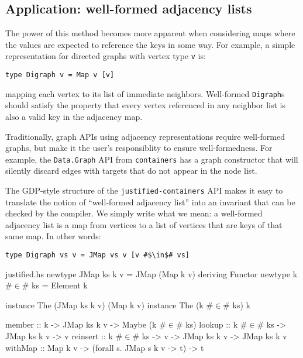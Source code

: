 \documentclass[format=sigplan, review=false, screen=true]{acmart}
\begin{document}
\subsection{Application: well-formed adjacency lists}

The power of this method becomes more apparent when considering maps where
the values are expected to reference the keys in some way. For example, a
simple representation for directed graphs with vertex type \texttt{v} is:
\begin{verbatim}
type Digraph v = Map v [v]
\end{verbatim}
mapping each vertex to its list of immediate neighbors. Well-formed \texttt{Digraph}s
should satisfy the property that every vertex referenced in any neighbor list is also
a valid key in the adjacency map.

Traditionally, graph APIs using adjacency representations require well-formed
graphs, but make it the user's responsiblity to ensure well-formedness. For example,
the \texttt{Data.Graph} API from \texttt{containers} has a graph constructor that
will silently discard edges with targets that do not appear in the node list.

The GDP-style structure of the \texttt{justified-containers} API makes it easy to
translate the notion of ``well-formed adjacency list'' into an invariant that can
be checked by the compiler. We simply write what we mean: a well-formed adjacency
list is a map from vertices to a list of vertices that are keys of that same map.
In other words:
\begin{verbatim}
type Digraph vs v = JMap vs v [v #$\in$# vs]
\end{verbatim}

\begin{filecontents*}{justified.hs}
newtype JMap ks k v = JMap (Map k v) deriving Functor
newtype k #$\in$# ks = Element k

instance The (JMap ks k v) (Map k v)
instance The (k #$\in$# ks) k

member   :: k -> JMap ks k v -> Maybe (k #$\in$# ks)
lookup   :: k #$\in$# ks -> JMap ks k v -> v
reinsert :: k #$\in$# ks -> v -> JMap ks k v -> JMap ks k v
withMap  :: Map k v -> (forall s. JMap s k v -> t) -> t
\end{filecontents*}

\end{document}
